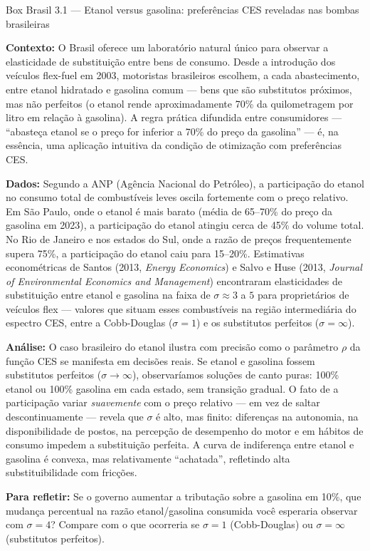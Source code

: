 \documentclass[11pt,twoside,openright]{book}
\begin{document}
\begin{boxbrasilbox}{Box Brasil 3.1 — Etanol versus gasolina: preferências CES reveladas nas bombas brasileiras}

\textbf{Contexto:} O Brasil oferece um laboratório natural único para
observar a elasticidade de substituição entre bens de consumo. Desde a
introdução dos veículos flex-fuel em 2003, motoristas brasileiros
escolhem, a cada abastecimento, entre etanol hidratado e gasolina comum
--- bens que são substitutos próximos, mas não perfeitos (o etanol rende
aproximadamente 70\% da quilometragem por litro em relação à gasolina).
A regra prática difundida entre consumidores --- ``abasteça etanol se o
preço for inferior a 70\% do preço da gasolina'' --- é, na essência, uma
aplicação intuitiva da condição de otimização com preferências CES.

\textbf{Dados:} Segundo a ANP (Agência Nacional do Petróleo), a
participação do etanol no consumo total de combustíveis leves oscila
fortemente com o preço relativo. Em São Paulo, onde o etanol é mais
barato (média de 65--70\% do preço da gasolina em 2023), a participação
do etanol atingiu cerca de 45\% do volume total. No Rio de Janeiro e nos
estados do Sul, onde a razão de preços frequentemente supera 75\%, a
participação do etanol caiu para 15--20\%. Estimativas econométricas de
Santos (2013, \emph{Energy Economics}) e Salvo e Huse (2013,
\emph{Journal of Environmental Economics and Management}) encontraram
elasticidades de substituição entre etanol e gasolina na faixa de
\(\sigma \approx 3\) a \(5\) para proprietários de veículos flex ---
valores que situam esses combustíveis na região intermediária do
espectro CES, entre a Cobb-Douglas (\(\sigma = 1\)) e os substitutos
perfeitos (\(\sigma = \infty\)).

\textbf{Análise:} O caso brasileiro do etanol ilustra com precisão como
o parâmetro \(\rho\) da função CES se manifesta em decisões reais. Se
etanol e gasolina fossem substitutos perfeitos (\(\sigma \to \infty\)),
observaríamos soluções de canto puras: 100\% etanol ou 100\% gasolina em
cada estado, sem transição gradual. O fato de a participação variar
\emph{suavemente} com o preço relativo --- em vez de saltar
descontinuamente --- revela que \(\sigma\) é alto, mas finito:
diferenças na autonomia, na disponibilidade de postos, na percepção de
desempenho do motor e em hábitos de consumo impedem a substituição
perfeita. A curva de indiferença entre etanol e gasolina é convexa, mas
relativamente ``achatada'', refletindo alta substituibilidade com
fricções.

\textbf{Para refletir:} Se o governo aumentar a tributação sobre a
gasolina em 10\%, que mudança percentual na razão etanol/gasolina
consumida você esperaria observar com \(\sigma = 4\)? Compare com o que
ocorreria se \(\sigma = 1\) (Cobb-Douglas) ou \(\sigma = \infty\)
(substitutos perfeitos).

\end{boxbrasilbox}
\end{document}
